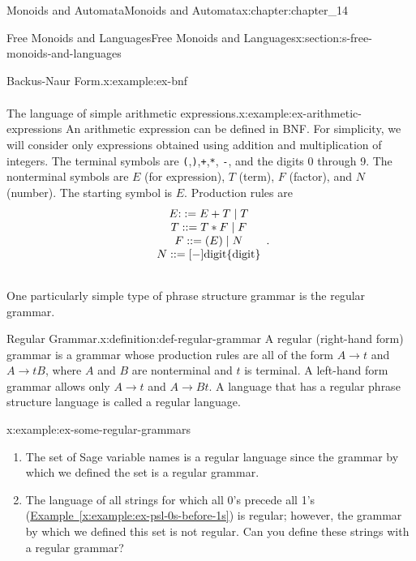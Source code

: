 \documentclass[oneside,10pt,]{book}
\newcommand{\xreffont}{\relax}
\newcommand{\mono}[1]{\texttt{#1}}
\numberwithin{equation}{section}
\begin{document}
\begin{chapterptx}{Monoids and Automata}{}{Monoids and Automata}{}{}{x:chapter:chapter_14}
\begin{sectionptx}{Free Monoids and Languages}{}{Free Monoids and Languages}{}{}{x:section:s-free-monoids-and-languages}
\begin{example}{Backus-Naur Form.}{x:example:ex-bnf}
\begin{equation*}
\begin{array}{l}
\end{array}
\end{equation*}
%
\end{example}
\begin{example}{The language of simple arithmetic expressions.}{x:example:ex-arithmetic-expressions}%
An arithmetic expression can be defined in BNF. For simplicity, we will consider only expressions obtained using addition and multiplication of integers. The terminal symbols are \mono{(},\mono{)},\mono{+},\mono{*}, \mono{-}, and the digits 0 through 9. The nonterminal symbols are \(E\) (for expression), \(T\) (term), \(F\) (factor), and \(N\) (number). The starting symbol is \(E\). Production rules are%
\begin{equation*}
\begin{array}{c}
E\text ::=E+T \mid T\\
T ::=T * F \mid F\\
F ::=(E)\mid N\\ 
N ::=[-]\textrm{digit} \{\textrm{digit}\}\\
\\
\end{array}\text{.}
\end{equation*}
%
\end{example}
One particularly simple type of phrase structure grammar is the regular grammar.%
\begin{definition}{Regular Grammar.}{x:definition:def-regular-grammar}%
%
A regular (right-hand form) grammar is a grammar whose production rules are all of the form \(A\to t\) and  \(A\to tB\), where \(A\) and \(B\) are nonterminal and \(t\) is terminal. A left-hand form grammar allows only \(A \to t\) and  \(A\to Bt\). A language that has a regular phrase structure language is called a regular language.%
\end{definition}
\begin{example}{}{x:example:ex-some-regular-grammars}%
%
\begin{enumerate}[label=(\alph*)]
\item{}The set of Sage variable names is a regular language since the grammar by which we defined the set is a regular grammar.%
\item{}The language of all strings for which all 0's precede all 1's (\hyperref[x:example:ex-psl-0s-before-1s]{Example~{\xreffont\ref{x:example:ex-psl-0s-before-1s}}}) is regular; however, the grammar by which we defined this set is not regular. Can you define these strings with a regular grammar?%

\end{enumerate}
\end{example}
\end{sectionptx}
\end{chapterptx}
\end{document}
